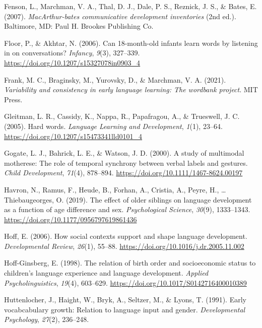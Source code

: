 \documentclass[
  english,
  man,floatsintext]{apa6}
\begin{document}
\leavevmode\hypertarget{ref-fenson_macarthur-bates_2007}{}%
Fenson, L., Marchman, V. A., Thal, D. J., Dale, P. S., Reznick, J. S., \& Bates, E. (2007). \emph{MacArthur-bates communicative development inventories} (2nd ed.). Baltimore, MD: Paul H. Brookes Publishing Co.

\leavevmode\hypertarget{ref-floor_can_2006}{}%
Floor, P., \& Akhtar, N. (2006). Can 18-month-old infants learn words by listening in on conversations? \emph{Infancy}, \emph{9}(3), 327--339. \url{https://doi.org/10.1207/s15327078in0903_4}

\leavevmode\hypertarget{ref-frank_variability_2021}{}%
Frank, M. C., Braginsky, M., Yurovsky, D., \& Marchman, V. A. (2021). \emph{Variability and consistency in early language learning: The wordbank project}. MIT Press.

\leavevmode\hypertarget{ref-gleitman_hard_2005}{}%
Gleitman, L. R., Cassidy, K., Nappa, R., Papafragou, A., \& Trueswell, J. C. (2005). Hard words. \emph{Language Learning and Development}, \emph{1}(1), 23--64. \url{https://doi.org/10.1207/s15473341lld0101_4}

\leavevmode\hypertarget{ref-gogate_study_2000}{}%
Gogate, L. J., Bahrick, L. E., \& Watson, J. D. (2000). A study of multimodal motherese: The role of temporal synchrony between verbal labels and gestures. \emph{Child Development}, \emph{71}(4), 878--894. \url{https://doi.org/10.1111/1467-8624.00197}

\leavevmode\hypertarget{ref-havron_effect_2019}{}%
Havron, N., Ramus, F., Heude, B., Forhan, A., Cristia, A., Peyre, H., \ldots{} Thiebaugeorges, O. (2019). The effect of older siblings on language development as a function of age difference and sex. \emph{Psychological Science}, \emph{30}(9), 1333--1343. \url{https://doi.org/10.1177/0956797619861436}

\leavevmode\hypertarget{ref-hoff_how_2006}{}%
Hoff, E. (2006). How social contexts support and shape language development. \emph{Developmental Review}, \emph{26}(1), 55--88. \url{https://doi.org/10.1016/j.dr.2005.11.002}

\leavevmode\hypertarget{ref-hoff-ginsberg_relation_1998}{}%
Hoff-Ginsberg, E. (1998). The relation of birth order and socioeconomic status to children's language experience and language development. \emph{Applied Psycholinguistics}, \emph{19}(4), 603--629. \url{https://doi.org/10.1017/S0142716400010389}

\leavevmode\hypertarget{ref-huttenlocher_early_1991}{}%
Huttenlocher, J., Haight, W., Bryk, A., Seltzer, M., \& Lyons, T. (1991). Early vocabcabulary growth: Relation to language input and gender. \emph{Developmental Psychology}, \emph{27}(2), 236--248.
\end{document}

